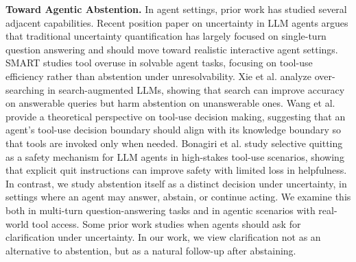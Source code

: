 \documentclass{llmxive}
\begin{document}
\textbf{Toward Agentic Abstention.} In agent settings, prior work has studied several adjacent capabilities. Recent position paper \cite{kirchhof2025position, oh2026uncertainty} on uncertainty in LLM agents argues that traditional uncertainty quantification has largely focused on single-turn question answering and should move toward realistic interactive agent settings. SMART \cite{qian2025smart} studies tool overuse in solvable agent tasks, focusing on tool-use efficiency rather than abstention under unresolvability. Xie et al. \cite{xie2026oversearchingsearchaugmentedlargelanguage} analyze over-searching in search-augmented LLMs, showing that search can improve accuracy on answerable queries but harm abstention on unanswerable ones. Wang et al. \cite{wang2025toward} provide a theoretical perspective on tool-use decision making, suggesting that an agent’s tool-use decision boundary should align with its knowledge boundary so that tools are invoked only when needed. Bonagiri et al. \cite{bonagiri2025check} study selective quitting as a safety mechanism for LLM agents in high-stakes tool-use scenarios, showing that explicit quit instructions can improve safety with limited loss in helpfulness. In contrast, we study abstention itself as a distinct decision under uncertainty, in settings where an agent may answer, abstain, or continue acting. We examine this both in multi-turn question-answering tasks and in agentic scenarios with real-world tool access. Some prior work \cite{zhang2025clarify, zhang2024clamber, kobalczyk2025active} studies when agents should ask for clarification under uncertainty. In our work, we view clarification not as an alternative to abstention, but as a natural follow-up after abstaining.
\end{document}
